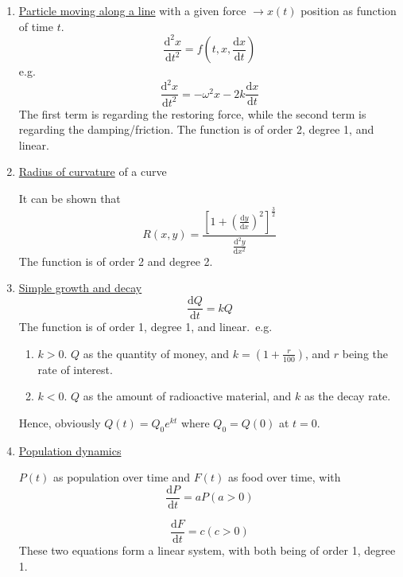 \documentclass[12pt]{report}
\theoremstyle{definition}
\begin{document}
\begin{ex}
    \;

    \begin{enumerate}[label = (\alph*)]
        \item \underline{Particle moving along a line} with a given force $\rightarrow x(t)$ position
            as function of time $t$.\[
                \frac{\mathrm{d}^{2} x}{\mathrm{d}t^{2}} = f\left(t, x, \frac{\mathrm{d} x}{\mathrm{d}t} \right) 
            \]e.g.\[
                \frac{\mathrm{d}^{2}x}{\mathrm{d}t^{2}} = -\omega^{2}x - 2k\frac{\mathrm{d} x}{\mathrm{d}t} 
            \]
            The first term is regarding the restoring force,
            while the second term is regarding the damping/friction.
            The function is of order 2, degree 1, and linear.

        \item \underline{Radius of curvature} of a curve

            It can be shown that \[
                R(x,y) = \frac{{\left[1 + {\left(\frac{\mathrm{d} y}{\mathrm{d}x} \right)}^{2}\right]}^{\frac{3}{2}}}
                {\frac{\mathrm{d}^{2}y}{\mathrm{d}x^{2}} }
            \]
            The function is of order 2 and degree 2.

        \item \underline{Simple growth and decay}\[
            \frac{\mathrm{d} Q}{\mathrm{d}t} = kQ
        \]
        The function is of order 1, degree 1, and linear.\ e.g. 
        \begin{enumerate}[label = (\arabic*)]
            \item $k > 0$. $Q$ as the quantity of money, and $k = (1 + \frac{r}{100})$, and $r$ being the rate of interest.
            \item $k < 0$. $Q$ as the amount of radioactive material, and $k$ as the decay rate.
        \end{enumerate}
        Hence, obviously $Q(t) = Q_0e^{kt}$ where $Q_0 = Q(0)$ at $t = 0$.

    \item \underline{Population dynamics}

        $P(t)$ as population over time and $F(t)$ as food over time, with
        \begin{equation}\label{ODE:2}
                \frac{\mathrm{d} P}{\mathrm{d}t} = aP (a>0)
            \end{equation}
            
        \[
        \frac{\mathrm{d} F}{\mathrm{d}t} = c (c>0)
        \]
        These two equations form a linear system, with both being of order 1, degree 1.
        

\end{enumerate}
\end{ex}
\end{document}
